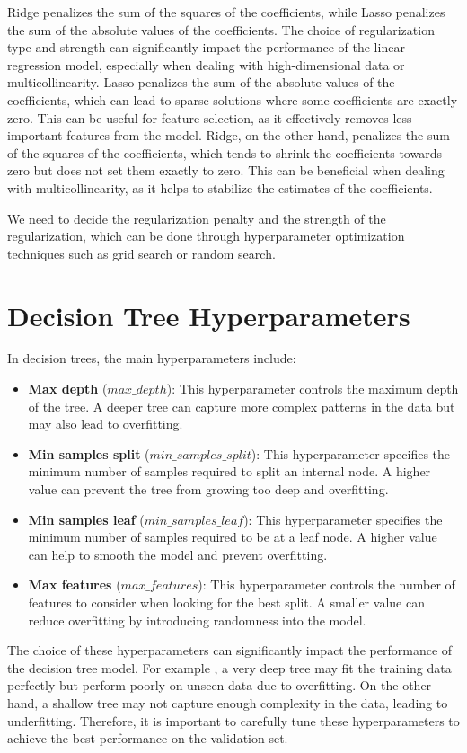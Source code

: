 \documentclass[conference]{IEEEtran}
\begin{document}
Ridge penalizes the sum of the squares of the coefficients, while Lasso penalizes the sum of the absolute values of the coefficients. The choice of regularization type and strength can significantly impact the performance of the linear regression model, especially when dealing with high-dimensional data or multicollinearity.
Lasso penalizes the sum of the absolute values of the coefficients, which can lead to sparse solutions where some coefficients are exactly zero. This can be useful for feature selection, as it effectively removes less important features from the model. Ridge, on the other hand, penalizes the sum of the squares of the coefficients, which tends to shrink the coefficients towards zero but does not set them exactly to zero. This can be beneficial when dealing with multicollinearity, as it helps to stabilize the estimates of the coefficients.

We need to decide the regularization penalty and the strength of the regularization, which can be done through hyperparameter optimization techniques such as grid search or random search.

\section*{Decision Tree Hyperparameters}
In decision trees, the main hyperparameters include:
\begin{itemize}
    \item \textbf{Max depth} ($max\_depth$): This hyperparameter controls the maximum depth of the tree. A deeper tree can capture more complex patterns in the data but may also lead to overfitting.
    \item \textbf{Min samples split} ($min\_samples\_split$): This hyperparameter specifies the minimum number of samples required to split an internal node. A higher value can prevent the tree from growing too deep and overfitting.
    \item \textbf{Min samples leaf} ($min\_samples\_leaf$): This hyperparameter specifies the minimum number of samples required to be at a leaf node. A higher value can help to smooth the model and prevent overfitting.
    \item \textbf{Max features} ($max\_features$): This hyperparameter controls the number of features to consider when looking for the best split. A smaller value can reduce overfitting by introducing randomness into the model.
\end{itemize}
The choice of these hyperparameters can significantly impact the performance of the decision tree model. For example
, a very deep tree may fit the training data perfectly but perform poorly on unseen data due to overfitting. On the other hand, a shallow tree may not capture enough complexity in the data, leading to underfitting. Therefore, it is important to carefully tune these hyperparameters to achieve the best performance on the validation set.
\end{document}
